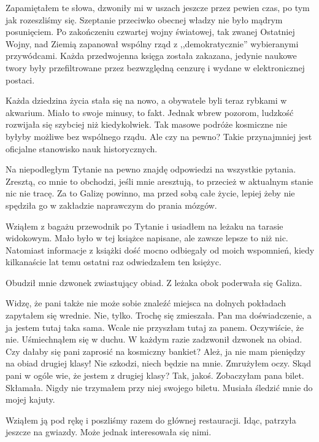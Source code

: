 Zapamiętałem te słowa, dzwoniły mi w uszach jeszcze przez pewien czas, po tym jak rozeszliśmy się.
Szeptanie przeciwko obecnej władzy nie było mądrym posunięciem.
Po zakończeniu czwartej wojny światowej, tak zwanej Ostatniej Wojny, nad Ziemią zapanował wspólny rząd z ,,demokratycznie'' wybieranymi przywódcami.
Każda przedwojenna księga została zakazana, jedynie naukowe twory były przefiltrowane przez bezwzględną cenzurę i wydane w elektronicznej postaci.

Każda dziedzina życia stała się na nowo, a obywatele byli teraz rybkami w akwarium.
Miało to swoje minusy, to fakt.
Jednak wbrew pozorom, ludzkość rozwijała się szybciej niż kiedykolwiek.
Tak masowe podróże kosmiczne nie byłyby możliwe bez wspólnego rządu.
Ale czy na pewno? Takie przynajmniej jest oficjalne stanowisko nauk historycznych.

Na niepodległym Tytanie na pewno znajdę odpowiedzi na wszystkie pytania.
Zresztą, co mnie to obchodzi, jeśli mnie aresztują, to przecież w aktualnym stanie nic nie tracę.
Za to Galizę powinno, ma przed sobą całe życie, lepiej żeby nie spędziła go w zakładzie naprawczym do prania mózgów.

Wziąłem z bagażu przewodnik po Tytanie i usiadłem na leżaku na tarasie widokowym.
Mało było w tej książce napisane, ale zawsze lepsze to niż nic.
Natomiast informacje z książki dość mocno odbiegały od moich wspomnień, kiedy kilkanaście lat temu ostatni raz odwiedzałem ten księżyc.

Obudził mnie dzwonek zwiastujący obiad.
Z leżaka obok poderwała się Galiza.

\begin{dialogue}
	\ds{} Widzę, że pani także nie może sobie znaleźć miejsca na dolnych pokładach \dm{} zapytałem się wrednie.
	\ds{} Nie, tylko. \dm{} Trochę się zmieszała. \dm{} Pan ma doświadczenie, a ja jestem tutaj taka sama. Wcale nie przyszłam tutaj za panem.
	\ds{} Oczywiście, że nie. \dm{} Uśmiechnąłem się w duchu. \dm{} W każdym razie zadzwonił dzwonek na obiad. Czy dałaby się pani zaprosić na kosmiczny bankiet?
	\ds{} Ależ, ja nie mam pieniędzy na obiad drugiej klasy!
	\ds{} Nie szkodzi, niech będzie na mnie. \dm{} Zmrużyłem oczy. \dm{} Skąd pani w ogóle wie, że jestem z drugiej klasy?
	\ds{} Tak, jakoś. Zobaczyłam pana bilet. \dm{} Skłamała. Nigdy nie trzymałem przy niej swojego biletu. Musiała śledzić mnie do mojej kajuty.
\end{dialogue}

Wziąłem ją pod rękę i poszliśmy razem do głównej restauracji.
Idąc, patrzyła jeszcze na gwiazdy.
Może jednak interesowała się nimi.

